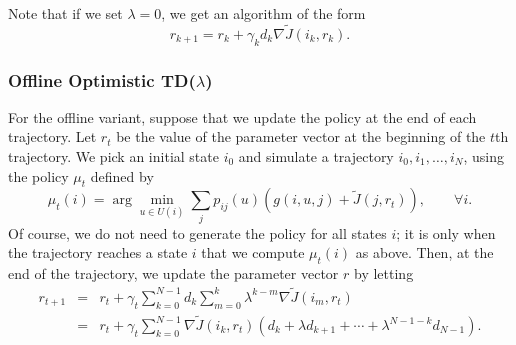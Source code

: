Note that if we set $\lambda = 0$, we get an algorithm of the form
$$ r_{k+1} = r_k + \gamma_k d_k \nabla \tilde J(i_k,r_k). $$





\subsubsection*{Offline Optimistic TD($\lambda$)}
For the offline variant, suppose that we update the policy at the end of each trajectory. Let $r_t$ be the value of the parameter vector at the beginning of the $t$th trajectory. We pick an initial state $i_0$ and simulate a trajectory $i_0,i_1,\ldots,i_N$, using the policy $\mu_t$ defined by 
$$ \mu_t(i) = \arg \min_{u \in U(i)} \sum_j p_{ij}(u) \left( g(i,u,j) + \tilde J(j,r_t) \right), \qquad \forall i.$$
Of course, we do not need to generate the policy for all states $i$; it is only when the trajectory reaches a state $i$ that we compute $\mu_t(i)$ as above. Then, at the end of the trajectory, we update the parameter vector $r$ by letting 
\begin{eqnarray} \label{eq:optimistic:offline}
r_{t+1} & = & r_t + \gamma_t \sum \limits_{k=0}^{N-1} d_k \sum \limits_{m=0}^k \lambda^{k-m} \nabla \tilde J(i_m,r_t) \\
& = & r_t + \gamma_t \sum \limits_{k=0}^{N-1} \nabla \tilde J(i_k,r_t)(d_k+\lambda d_{k+1}+\cdots+\lambda^{N-1-k}d_{N-1}). \nonumber
\end{eqnarray}


